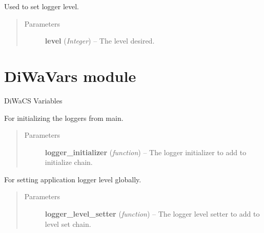 \documentclass[letterpaper,10pt,english]{sphinxmanual}
\begin{document}
\begin{fulllineitems}
\label{diwacs:diwacs.set_logger_level}
Used to set logger level.
\begin{quote}\begin{description}
\item[{Parameters}] \leavevmode
\textbf{level} (\emph{Integer}) -- The level desired.

\end{description}\end{quote}

\end{fulllineitems}



\section{DiWaVars module}
\label{diwavars:module-diwavars}\label{diwavars:diwavars-module}\label{diwavars::doc}
DiWaCS Variables

\begin{fulllineitems}
\label{diwavars:diwavars.add_logger_initializer}
For initializing the loggers from main.
\begin{quote}\begin{description}
\item[{Parameters}] \leavevmode
\textbf{logger\_initializer} (\emph{function}) -- The logger initializer to add to initialize chain.

\end{description}\end{quote}

\end{fulllineitems}


\begin{fulllineitems}
\label{diwavars:diwavars.add_logger_level_setter}
For setting application logger level globally.
\begin{quote}\begin{description}
\item[{Parameters}] \leavevmode
\textbf{logger\_level\_setter} (\emph{function}) -- The logger level setter to add to level set chain.

\end{description}\end{quote}

\end{fulllineitems}
\end{document}
